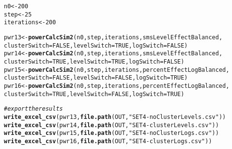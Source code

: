 \documentclass[10pt]{article}\usepackage[]{graphicx}\usepackage[]{color}
\makeatletter
\newcommand{\hlnum}[1]{\textcolor[rgb]{0.686,0.059,0.569}{#1}}%
\newcommand{\hlstr}[1]{\textcolor[rgb]{0.192,0.494,0.8}{#1}}%
\newcommand{\hlcom}[1]{\textcolor[rgb]{0.678,0.584,0.686}{\textit{#1}}}%
\newcommand{\hlstd}[1]{\textcolor[rgb]{0.345,0.345,0.345}{#1}}%
\newcommand{\hlkwb}[1]{\textcolor[rgb]{0.69,0.353,0.396}{#1}}%
\newcommand{\hlkwc}[1]{\textcolor[rgb]{0.333,0.667,0.333}{#1}}%
\newcommand{\hlkwd}[1]{\textcolor[rgb]{0.737,0.353,0.396}{\textbf{#1}}}%
\newenvironment{kframe}{%
 \def\at@end@of@kframe{}%
 \ifinner\ifhmode%
  \def\at@end@of@kframe{\end{minipage}}%
  \begin{minipage}{\columnwidth}%
 \fi\fi%
 \def\FrameCommand##1{\hskip\@totalleftmargin \hskip-\fboxsep
 \colorbox{shadecolor}{##1}\hskip-\fboxsep
     \hskip-\linewidth \hskip-\@totalleftmargin \hskip\columnwidth}%
 \MakeFramed {\advance\hsize-\width
   \@totalleftmargin\z@ \linewidth\hsize
   \@setminipage}}%
 {\par\unskip\endMakeFramed%
 \at@end@of@kframe}
\newenvironment{knitrout}{}{} %
\makeatother
\begin{document}
\begin{knitrout}
\color{fgcolor}\begin{kframe}
\begin{alltt}
\hlstd{n0} \hlkwb{<-} \hlnum{200}
\hlstd{step} \hlkwb{<-} \hlnum{25}
\hlstd{iterations} \hlkwb{<-} \hlnum{200}

\hlstd{pwr13} \hlkwb{<-} \hlkwd{powerCalcSim2}\hlstd{(n0,step,iterations, smsLevelEffectBalanced,}
                       \hlkwc{clusterSwitch} \hlstd{=} \hlnum{FALSE}\hlstd{,} \hlkwc{levelSwitch} \hlstd{=} \hlnum{TRUE}\hlstd{,}  \hlkwc{logSwitch} \hlstd{=} \hlnum{FALSE}\hlstd{)}
\hlstd{pwr14} \hlkwb{<-} \hlkwd{powerCalcSim2}\hlstd{(n0,step,iterations, smsLevelEffectBalanced,}
                       \hlkwc{clusterSwitch} \hlstd{=} \hlnum{TRUE}\hlstd{,}  \hlkwc{levelSwitch} \hlstd{=} \hlnum{TRUE}\hlstd{,}  \hlkwc{logSwitch} \hlstd{=} \hlnum{FALSE}\hlstd{)}
\hlstd{pwr15} \hlkwb{<-} \hlkwd{powerCalcSim2}\hlstd{(n0,step,iterations, percentEffectLogBalanced,}
                       \hlkwc{clusterSwitch} \hlstd{=} \hlnum{FALSE}\hlstd{,} \hlkwc{levelSwitch} \hlstd{=} \hlnum{FALSE}\hlstd{,} \hlkwc{logSwitch} \hlstd{=} \hlnum{TRUE}\hlstd{)}
\hlstd{pwr16} \hlkwb{<-} \hlkwd{powerCalcSim2}\hlstd{(n0,step,iterations,percentEffectLogBalanced,}
                       \hlkwc{clusterSwitch} \hlstd{=} \hlnum{TRUE}\hlstd{,}  \hlkwc{levelSwitch} \hlstd{=} \hlnum{FALSE}\hlstd{,} \hlkwc{logSwitch} \hlstd{=} \hlnum{TRUE}\hlstd{)}
\end{alltt}
\end{kframe}
\end{knitrout}

\begin{knitrout}
\color{fgcolor}\begin{kframe}
\begin{alltt}
\hlcom{# export the results}
\hlkwd{write_excel_csv}\hlstd{(pwr13,} \hlkwd{file.path}\hlstd{(OUT,}\hlstr{"SET4-noClusterLevels.csv"}\hlstd{))}
\hlkwd{write_excel_csv}\hlstd{(pwr14,} \hlkwd{file.path}\hlstd{(OUT,}\hlstr{"SET4-clusterLevels.csv"}\hlstd{))}
\hlkwd{write_excel_csv}\hlstd{(pwr15,} \hlkwd{file.path}\hlstd{(OUT,}\hlstr{"SET4-noClusterLogs.csv"}\hlstd{))}
\hlkwd{write_excel_csv}\hlstd{(pwr16,} \hlkwd{file.path}\hlstd{(OUT,}\hlstr{"SET4-clusterLogs.csv"}\hlstd{))}
\end{alltt}
\end{kframe}
\end{knitrout}
\end{document}
